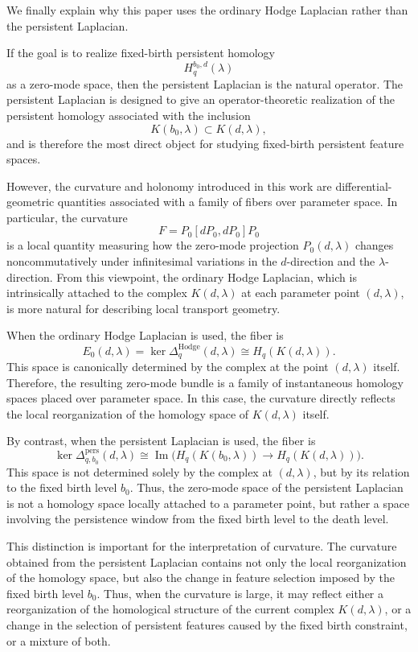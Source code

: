 \documentclass[pdflatex,sn-mathphys-num]{sn-jnl}%
\theoremstyle{thmstyleone}%
\theoremstyle{thmstyletwo}%
\theoremstyle{thmstylethree}%
\begin{document}
We finally explain why this paper uses the ordinary Hodge Laplacian rather than the persistent Laplacian.

If the goal is to realize fixed-birth persistent homology
\[
H_q^{b_0,d}(\lambda)
\]
as a zero-mode space, then the persistent Laplacian is the natural operator. The persistent Laplacian is designed to give an operator-theoretic realization of the persistent homology associated with the inclusion
\[
K(b_0,\lambda)\subset K(d,\lambda),
\]
and is therefore the most direct object for studying fixed-birth persistent feature spaces.

However, the curvature and holonomy introduced in this work are differential-geometric quantities associated with a family of fibers over parameter space. In particular, the curvature
\[
F=P_0[dP_0,dP_0]P_0
\]
is a local quantity measuring how the zero-mode projection \(P_0(d,\lambda)\) changes noncommutatively under infinitesimal variations in the \(d\)-direction and the \(\lambda\)-direction. From this viewpoint, the ordinary Hodge Laplacian, which is intrinsically attached to the complex \(K(d,\lambda)\) at each parameter point \((d,\lambda)\), is more natural for describing local transport geometry.

When the ordinary Hodge Laplacian is used, the fiber is
\[
E_0(d,\lambda)
=
\ker\Delta_q^{\mathrm{Hodge}}(d,\lambda)
\cong
H_q(K(d,\lambda)).
\]
This space is canonically determined by the complex at the point \((d,\lambda)\) itself. Therefore, the resulting zero-mode bundle is a family of instantaneous homology spaces placed over parameter space. In this case, the curvature directly reflects the local reorganization of the homology space of \(K(d,\lambda)\) itself.

By contrast, when the persistent Laplacian is used, the fiber is
\[
\ker\Delta_{q,b_0}^{\mathrm{pers}}(d,\lambda)
\cong
\operatorname{Im}
\bigl(
H_q(K(b_0,\lambda))
\to
H_q(K(d,\lambda))
\bigr).
\]
This space is not determined solely by the complex at \((d,\lambda)\), but by its relation to the fixed birth level \(b_0\). Thus, the zero-mode space of the persistent Laplacian is not a homology space locally attached to a parameter point, but rather a space involving the persistence window from the fixed birth level to the death level.

This distinction is important for the interpretation of curvature. The curvature obtained from the persistent Laplacian contains not only the local reorganization of the homology space, but also the change in feature selection imposed by the fixed birth level \(b_0\). Thus, when the curvature is large, it may reflect either a reorganization of the homological structure of the current complex \(K(d,\lambda)\), or a change in the selection of persistent features caused by the fixed birth constraint, or a mixture of both.
\end{document}
